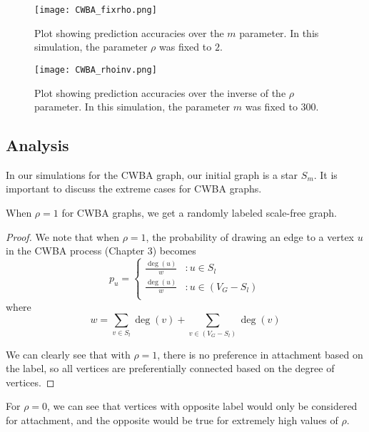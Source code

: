 \begin{figure}[H]
\centering
\texttt{[image: CWBA\_fixrho.png]}
\caption{Plot showing prediction accuracies over the $m$ parameter. In this simulation, the parameter $\rho$ was fixed to $2$.}
\label{fig:CWBA_fixrho}
\end{figure}

\begin{figure}[H]
\centering
\texttt{[image: CWBA\_rhoinv.png]}
\caption{Plot showing prediction accuracies over the inverse of the $\rho$
parameter. In this simulation, the parameter $m$ was fixed to $300$.}
\label{fig:CWBA_rhoinv}
\end{figure}

\subsection{Analysis}
In our simulations for the CWBA graph, our initial graph is a star $S_m$.
It is important to discuss the extreme cases for CWBA graphs.

\begin{proposition}
When $\rho=1$ for CWBA graphs, we get a randomly labeled scale-free graph.
\end{proposition}
\begin{proof}
We note that when $\rho=1$, the probability of drawing an edge to a vertex $u$ in the CWBA process (Chapter 3) becomes
\[
  p_u = \begin{cases}
    \frac{\deg(u)}{w} &: u \in S_l\\
    
    \frac{\deg(u)}{w} &: u \in (V_G - S_l)\\
  \end{cases}
\]
where
\[
  w = \sum_{v \in S_l}\deg(v) + \sum_{v \in (V_G - S_l)}\deg(v)
\]

We can clearly see that with $\rho=1$, there is no preference in attachment
based on the label, so all vertices are preferentially connected based on
the degree of vertices.
\end{proof}

For $\rho=0$, we can see that vertices with opposite label would only be
considered for attachment, and the opposite would be true for extremely 
high values of $\rho$.

